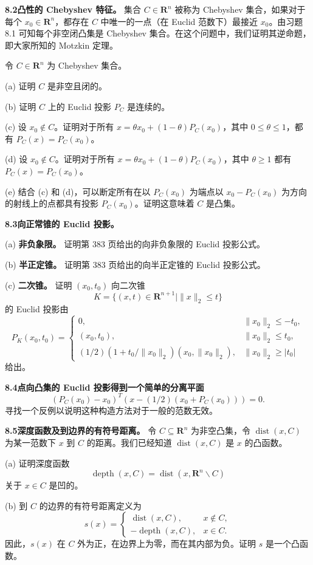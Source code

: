\documentclass[UTF8,12pt,a4paper,fontset=fandol]{ctexart}
\begin{document}
\noindent\textbf{8.2 凸性的 Chebyshev 特征。}
集合 $C\in\mathbf{R}^n$ 被称为 Chebyshev 集合，如果对于每个 $x_0\in\mathbf{R}^n$，都存在 $C$ 中唯一的一点（在 Euclid 范数下）最接近 $x_0$。由习题 8.1 可知每个非空闭凸集是 Chebyshev 集合。在这个问题中，我们证明其逆命题，即大家所知的 Motzkin 定理。

令 $C\in\mathbf{R}^n$ 为 Chebyshev 集合。

(a) 证明 $C$ 是非空且闭的。

(b) 证明 $C$ 上的 Euclid 投影 $P_C$ 是连续的。

(c) 设 $x_0\notin C$。证明对于所有 $x=\theta x_0+(1-\theta)P_C(x_0)$，其中 $0\leq\theta\leq 1$，都有 $P_C(x)=P_C(x_0)$。

(d) 设 $x_0\notin C$。证明对于所有 $x=\theta x_0+(1-\theta)P_C(x_0)$，其中 $\theta\geq 1$ 都有 $P_C(x)=P_C(x_0)$。

(e) 结合 (c) 和 (d)，可以断定所有在以 $P_C(x_0)$ 为端点以 $x_0-P_C(x_0)$ 为方向的射线上的点都具有投影 $P_C(x_0)$。证明这意味着 $C$ 是凸集。

\noindent\textbf{8.3\quad 向正常锥的 Euclid 投影。}

(a) \textbf{非负象限。} 证明第 383 页给出的向非负象限的 Euclid 投影公式。

(b) \textbf{半正定锥。} 证明第 383 页给出的向半正定锥的 Euclid 投影公式。

(c) \textbf{二次锥。} 证明 $(x_0,t_0)$ 向二次锥
\[
K=\{(x,t)\in\mathbf{R}^{n+1}\mid \|x\|_2\leq t\}
\]
的 Euclid 投影由
\[
P_K(x_0,t_0)=
\begin{cases}
0, & \|x_0\|_2\leq -t_0,\\
(x_0,t_0), & \|x_0\|_2\leq t_0,\\
(1/2)(1+t_0/\|x_0\|_2)(x_0,\|x_0\|_2), & \|x_0\|_2\geq |t_0|
\end{cases}
\]
给出。

\noindent\textbf{8.4\quad 点向凸集的 Euclid 投影得到一个简单的分离平面}
\[
\left(P_C(x_0)-x_0\right)^T\left(x-(1/2)(x_0+P_C(x_0))\right)=0.
\]
寻找一个反例以说明这种构造方法对于一般的范数无效。

\noindent\textbf{8.5\quad [HUL93, 第 1 卷，第 154 页] 深度函数及到边界的有符号距离。}
令 $C\subseteq\mathbf{R}^n$ 为非空凸集，令 $\operatorname{dist}(x,C)$ 为某一范数下 $x$ 到 $C$ 的距离。我们已经知道 $\operatorname{dist}(x,C)$ 是 $x$ 的凸函数。

(a) 证明深度函数
\[
\operatorname{depth}(x,C)=\operatorname{dist}(x,\mathbf{R}^n\backslash C)
\]
关于 $x\in C$ 是凹的。

(b) 到 $C$ 的边界的有符号距离定义为
\[
s(x)=
\begin{cases}
\operatorname{dist}(x,C), & x\notin C,\\
-\operatorname{depth}(x,C), & x\in C.
\end{cases}
\]
因此，$s(x)$ 在 $C$ 外为正，在边界上为零，而在其内部为负。证明 $s$ 是一个凸函数。
\end{document}
